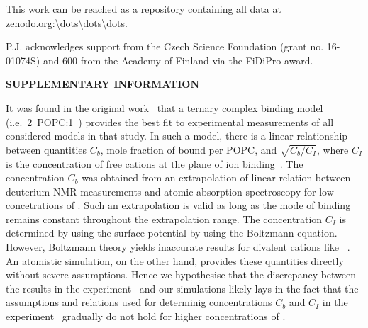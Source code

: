 \documentclass[aip,jcp,twocolumn]{revtex4}
\begin{document}




This work can be reached as a repository containing all data at \url{zenodo.org:\dots\dots\dots}.



\begin{acknowledgments}
P.J. acknowledges support from the Czech Science Foundation (grant no. 16-01074S) 
and 600 from the Academy of Finland via the FiDiPro award.
\end{acknowledgments}


\newpage
\newpage
\appendix






\begin{center}
{\bf SUPPLEMENTARY INFORMATION}
\end{center}

It was found in the original work~\cite{altenbach84} that 
a ternary complex binding model (i.e.~2~POPC:1~)
provides the best fit to experimental measurements of all considered models in that study. 
In such a model, there is a linear relationship between quantities 
$C_b$, mole fraction of bound  per POPC, and $\sqrt{C_b/C_I}$, 
where $C_I$ is the concentration of free cations at the plane of ion binding~\cite{altenbach84}.
The concentration $C_b$ was obtained from an extrapolation of linear relation 
between deuterium NMR measurements and atomic absorption spectroscopy for low concetrations of .
Such an extrapolation is valid as long as the mode of  binding 
remains constant throughout the extrapolation range. 
The concentration $C_I$ is determined by using the surface potential by using the Boltzmann equation.
However, Boltzmann theory yields inaccurate results
for divalent cations like ~\cite{Andelman1995}. 
An atomistic simulation, on the other hand, provides these quantities directly without severe assumptions.
Hence we hypothesise that the discrepancy between the results in the experiment~\cite{altenbach84} and 
our simulations likely lays in the fact that 
the assumptions and relations used for determinig concentrations $C_b$ and $C_I$ in the experiment~\cite{altenbach84}
gradually do not hold for higher concentrations of . 
\end{document}
